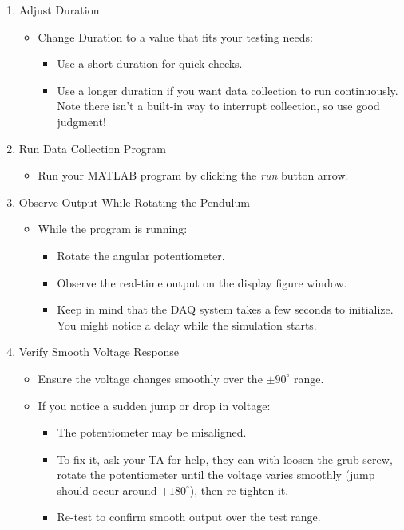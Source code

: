 \documentclass{article}
\begin{document}
\begin{enumerate}
    \item Adjust Duration
    \begin{itemize}
        \item Change Duration to a value that fits your testing needs:
        \begin{itemize}
            \item Use a short duration for quick checks.
            \item Use a longer duration if you want data collection  to run continuously. Note there isn't a built-in way to interrupt collection, so use good judgment! 
        \end{itemize}
    \end{itemize}
    
    \item Run Data Collection Program
    \begin{itemize}
        \item Run your MATLAB program by clicking the \textit{run} button arrow.
    \end{itemize}
    
    \item Observe Output While Rotating the Pendulum
    \begin{itemize}
        \item While the program is running:
        \begin{itemize}
            \item Rotate the angular potentiometer.
            \item Observe the real-time output on the display figure window.
            \item Keep in mind that the DAQ system takes a few seconds to initialize. You might notice a delay while the simulation starts. 
        \end{itemize}
    \end{itemize}
    
    \item Verify Smooth Voltage Response
    \begin{itemize}
        \item Ensure the voltage changes smoothly over the $\pm 90^\circ$ range.
        \item If you notice a sudden jump or drop in voltage:
        \begin{itemize}
            \item The potentiometer may be misaligned.
            \item To fix it, ask your TA for help, they can with loosen the grub screw, rotate the potentiometer until the voltage varies smoothly (jump should occur around $+180^\circ$), then re-tighten it.
            \item Re-test to confirm smooth output over the test range.
        \end{itemize}
    \end{itemize}
\end{enumerate}
\end{document}
